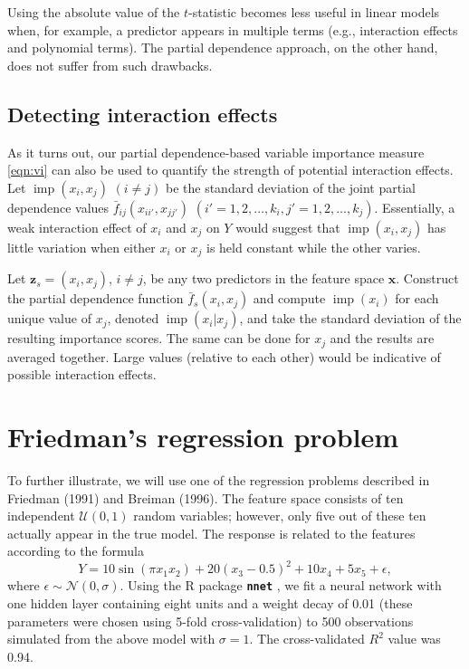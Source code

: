 \documentclass[12pt]{article}
\newcommand{\pkg}[1]{\texorpdfstring%
{{\normalfont\fontseries{b}\selectfont #1}}%
{#1}}
\def\pkg#1{\textbf{\texttt{#1}}}
\DeclareMathOperator{\imp}{imp}
\begin{document}
Using the absolute value of the $t$-statistic becomes less useful in linear models when, for example, a predictor appears in multiple terms (e.g., interaction effects and polynomial terms). The partial dependence approach, on the other hand, does not suffer from such drawbacks.


\subsection{Detecting interaction effects}
\label{sec:interaction}

As it turns out, our partial dependence-based variable importance measure \eqref{eqn:vi} can also be used to quantify the strength of potential interaction effects. Let $\imp\left(x_i, x_j\right)$ $\left(i \ne j\right)$ be the standard deviation of the joint partial dependence values $\bar{f}_{ij}\left(x_{ii'}, x_{jj'}\right)$ $\left(i' = 1, 2, \dots, k_i, j' = 1, 2, \dots, k_j\right)$. Essentially, a weak interaction effect of $x_i$ and $x_j$ on $Y$ would suggest that $\imp\left(x_i, x_j\right)$ has little variation when either $x_i$ or $x_j$ is held constant while the other varies. 

Let $\boldsymbol{z}_s = \left(x_i, x_j\right)$, $i \neq j$, be any two predictors in the feature space $\boldsymbol{x}$. Construct the partial dependence function $\bar{f}_s\left(x_i, x_j\right)$ and compute $\imp\left(x_i\right)$ for each unique value of $x_j$, denoted $\imp\left(x_i | x_j\right)$, and take the standard deviation of the resulting importance scores. The same can be done for $x_j$ and the results are averaged together. Large values (relative to each other) would be indicative of possible interaction effects. 


\section{Friedman's regression problem}

To further illustrate, we will use one of the regression problems described in Friedman (1991) and Breiman (1996). The feature space consists of ten independent $\mathcal{U}\left(0, 1\right)$ random variables; however, only five out of these ten actually appear in the true model. The response is related to the features according to the formula
\begin{equation*}
Y = 10 \sin\left(\pi x_1 x_2\right) + 20 \left(x_3 - 0.5\right) ^ 2 + 10 x_4 + 5 x_5 + \epsilon,
\end{equation*}
where $\epsilon \sim \mathcal{N}\left(0, \sigma\right)$. Using the R package \pkg{nnet} \citep{venables-modern-2002}, we fit a neural network with one hidden layer containing eight units and a weight decay of 0.01 (these parameters were chosen using 5-fold cross-validation) to 500 observations simulated from the above model with $\sigma = 1$. The cross-validated $R^2$ value was 0.94.
\end{document}
